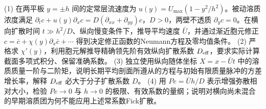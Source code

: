(1) 在两平板 \(y=\pm h\) 间的定常层流速度为 \(u(y)=U_{\max}(1-y^2/h^2)\)。被动溶质浓度满足 \(\partial_t c+u(y)\partial_xc=D(\partial_{xx}+\partial_{yy})c\)，\(D>0\)，两壁不透质 \(\partial_yc=0\)。在横向扩散时间 \(t\gg h^2/D\)、纵向慢变条件下，推导平均速度 \(\bar U\)，并通过渐近胞元修正 \(c=\bar c+\chi(y)\partial_x\bar c+\cdots\) 得到决定修正函数的Neumann方程及零均值条件。
(2) 严格求 \(\chi'(y)\)，利用胞元解推导精确领先阶有效纵向扩散系数 \(D_{\rm eff}\)，要求实际计算截面多项式积分、保留准确系数。
(3) 独立使用纵向随体坐标 \(X=x-\bar Ut\) 中的溶质质量一阶与二阶矩，说明长期平均剖面所遵从的方程与初始有限质量脉冲的方差增长率，解释 \(D_{\rm eff}\) 必大于分子扩散系数 \(D\)。
(4) 用 \(Pe=\bar Uh/D\) 表示增强弥散相对大小，检验 \(Pe\to0\) 与 \(h\to0\) 的极限、有效系数的量纲；说明对横向尚未混合的早期溶质团为何不能应用上述常系数Fick扩散。
